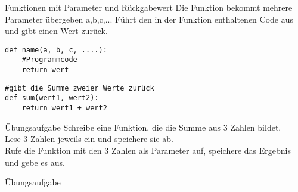 \begin{frame}[fragile]{Funktionen mit Parameter und Rückgabewert}
Die Funktion bekommt mehrere Parameter übergeben a,b,c,... 
Führt den in der Funktion enthaltenen Code aus und gibt einen Wert zurück.
\begin{lstlisting}
def name(a, b, c, ....):
	#Programmcode
	return wert
\end{lstlisting}

\begin{lstlisting}
#gibt die Summe zweier Werte zurück
def sum(wert1, wert2):
	return wert1 + wert2	
\end{lstlisting}
\end{frame}

\begin{frame}[fragile]{Übungsaufgabe}
Schreibe eine Funktion, die die Summe aus 3 Zahlen bildet.\\
Lese 3 Zahlen jeweils ein und speichere sie ab.\\
Rufe die Funktion mit den 3 Zahlen als Parameter auf, speichere das Ergebnis und gebe es aus.

\end{frame}


\begin{frame}[fragile]{Übungsaufgabe}


\end{frame}







